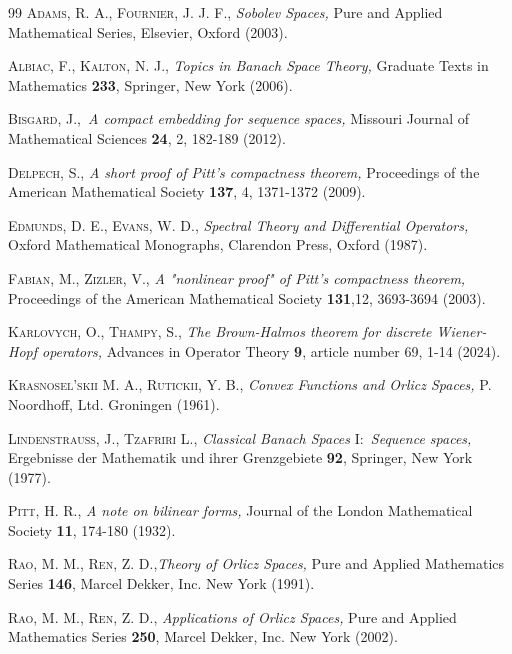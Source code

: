 \documentclass{article}
\begin{document}
\begin{thebibliography}{99}
 \textsc{Adams, R. A., Fournier, J. J. F., }\textit{%
Sobolev Spaces,} Pure and Applied Mathematical Series, Elsevier, Oxford
(2003).

 \textsc{Albiac, F., Kalton, N. J., }\textit{Topics in
Banach Space Theory,} Graduate Texts in Mathematics \textbf{233}, Springer,
New York (2006).

 \textsc{Bisgard, J.,}\textit{\ A compact embedding for
sequence spaces,} Missouri Journal of Mathematical Sciences \textbf{24}, 2,
182-189 (2012).

 \textsc{Delpech, S.,} \textit{A short proof of Pitt's
compactness theorem,} Proceedings of the American Mathematical Society 
\textbf{137}, 4, 1371-1372 (2009).

 \textsc{Edmunds, D. E., Evans, W. D.,} \textit{%
Spectral Theory and Differential Operators,} Oxford Mathematical Monographs,
Clarendon Press, Oxford (1987).

 \textsc{Fabian, M., Zizler, V.,} \textit{A "nonlinear
proof" of Pitt's compactness theorem,} Proceedings of the American
Mathematical Society \textbf{131},12, 3693-3694 (2003).

 \textsc{Karlovych, O., Thampy, S., }\textit{The
Brown-Halmos theorem for discrete Wiener-Hopf operators, }Advances in
Operator Theory \textbf{9}, article number 69, 1-14 (2024).

 \textsc{Krasnosel'skii M. A., Rutickii, Y. B.,} \textit{%
Convex Functions and Orlicz Spaces,} P. Noordhoff, Ltd. Groningen (1961).

 \textsc{Lindenstrauss, J., Tzafriri L.,} \textit{%
Classical Banach Spaces }I:\textit{\ Sequence spaces,} Ergebnisse der
Mathematik und ihrer Grenzgebiete \textbf{92}, Springer, New York (1977).

 \textsc{Pitt, H. R., }\textit{A note on bilinear forms,}
Journal of the London Mathematical Society \textbf{11}, 174-180 (1932).

 \textsc{Rao, M. M., Ren, Z. D.},\textit{Theory of Orlicz
Spaces,} Pure and Applied Mathematics Series \textbf{146}, Marcel Dekker,
Inc. New York (1991).

 \textsc{Rao, M. M., Ren, Z. D.,} \textit{Applications of
Orlicz Spaces,} Pure and Applied Mathematics Series \textbf{250}, Marcel
Dekker, Inc. New York (2002).


\end{thebibliography}
\end{document}
